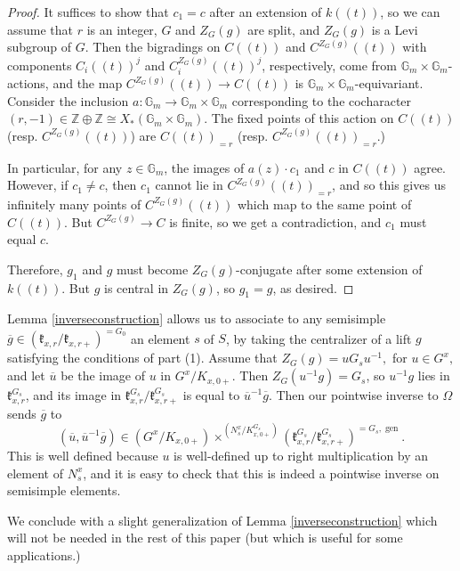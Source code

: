 \documentclass[12pt]{article}
\newcommand{\on}{\operatorname}
\theoremstyle{remark}
\begin{document}
\begin{proof}
It suffices to show that $c_1=c$ after an extension of $k((t))$, so we can assume that $r$ is an integer, $G$ and $Z_G(g)$ are split, and $Z_G(g)$ is a Levi subgroup of $G$. Then the bigradings on $C((t))$ and $C^{Z_G(g)}((t))$ with components $C_i((t))^j$ and $C^{Z_G(g)}_i((t))^j$, respectively, come from $\mathbb{G}_m\times\mathbb{G}_m$-actions, and the map $C^{Z_G(g)}((t))\rightarrow C((t))$ is $\mathbb{G}_m\times\mathbb{G}_m$-equivariant. Consider the inclusion $a:\mathbb{G}_m\rightarrow\mathbb{G}_m\times\mathbb{G}_m$ corresponding to the cocharacter $(r,-1)\in\mathbb{Z}\oplus\mathbb{Z}\cong X_*(\mathbb{G}_m\times\mathbb{G}_m).$ The fixed points of this action on $C((t))$ (resp. $C^{Z_G(g)}((t))$) are $C((t))_{=r}$ (resp. $C^{Z_G(g)}((t))_{=r}$.)

In particular, for any $z\in\mathbb{G}_m$, the images of $a(z)\cdot c_1$ and $c$ in $C((t))$ agree. However, if $c_1\neq c$, then $c_1$ cannot lie in $C^{Z_G(g)}((t))_{=r}$, and so this gives us infinitely many points of $C^{Z_G(g)}((t))$ which map to the same point of $C((t))$. But $C^{Z_G(g)}\rightarrow C$ is finite, so we get a contradiction, and $c_1$ must equal $c$.

Therefore, $g_1$ and $g$ must become $Z_G(g)$-conjugate after some extension of $k((t))$. But $g$ is central in $Z_G(g)$, so $g_1=g$, as desired.

\end{proof}

Lemma \ref{inverseconstruction} allows us to associate to any semisimple $\overline{g}\in(\mathfrak{k}_{x,r}/\mathfrak{k}_{x,r+})^{=G_0}$ an element $s$ of $S$, by taking the centralizer of a lift $g$ satisfying the conditions of part (1). Assume that $Z_G(g)=uG_su^{-1},$ for $u\in G^x,$ and let $\overline{u}$ be the image of $u$ in $G^x/K_{x,0+}.$ Then $Z_G(u^{-1}g)=G_s$, so $u^{-1}g$ lies in $\mathfrak{k}^{G_s}_{x,r}$, and its image in $\mathfrak{k}^{G_s}_{x,r}/\mathfrak{k}^{G_s}_{x,r+}$ is equal to $\overline{u}^{-1}\overline{g}$. Then our pointwise inverse to $\Omega$ sends $\overline{g}$ to
\[
(\overline{u}, \overline{u}^{-1}\overline{g})\in(G^x/K_{x,0+})\times^{(N^x_s/K_{x,0+}^{G_s})}(\mathfrak{k}_{x,r}^{G_s}/\mathfrak{k}_{x,r+}^{G_s})^{=G_s,\on{gen}}.
\]
This is well defined because $u$ is well-defined up to right multiplication by an element of $N_s^x$, and it is easy to check that this is indeed a pointwise inverse on semisimple elements.

We conclude with a slight generalization of Lemma \ref{inverseconstruction} which will not be needed in the rest of this paper (but which is useful for some applications.)
\end{document}
